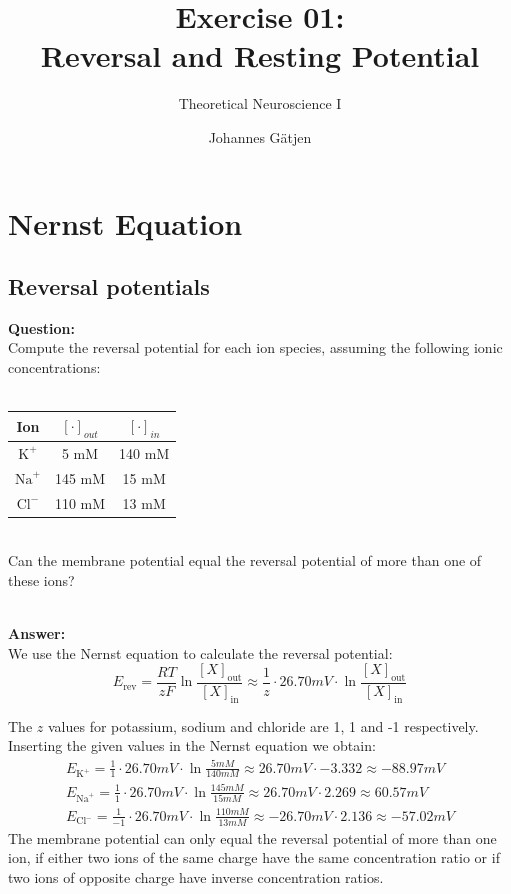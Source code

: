 \documentclass{scrartcl}
\title{Exercise 01:\\Reversal and Resting Potential}
\subtitle{Theoretical Neuroscience I}
\author{Johannes G\"atjen}
\newcommand\Answer{%
  \textbf{\\Answer:}%
}
\newcommand\Question{%
  \textbf{Question:}%
}
\begin{document}
\maketitle

\section{Nernst Equation}
\subsection{Reversal potentials}

\Question\\
Compute the reversal potential for each ion species, assuming the following ionic concentrations:\\
\\
\begin{tabular}{c | c c}
Ion & $[\cdot]_{out}$ & $[\cdot]_{in}$ \\ \hline
$\text{K}^+$ & 5 mM & 140 mM \\
$\text{Na}^+$ & 145 mM & 15 mM \\
$\text{Cl}^-$ & 110 mM & 13 mM
\end{tabular}\\
Can the membrane potential equal the reversal potential of more than one of these ions?

\Answer\\
We use the Nernst equation to calculate the reversal potential:
\begin{equation*}
E_{\text{rev}}=\frac{RT}{zF}\ln \frac{[X]_{\text{out}}}{[X]_{\text{in}}} \approx \frac{1}{z} \cdot 26.70 \si{mV} \cdot \ln \frac{[X]_{\text{out}}}{[X]_{\text{in}}}
\end{equation*}

The $z$ values for potassium, sodium and chloride are 1, 1 and -1 respectively. Inserting the given values in the Nernst equation we obtain:
\begin{equation*}
\begin{split}
E_{\text{K}^+}=\frac{1}{1} \cdot 26.70 \si{mV} \cdot \ln \frac{5 \si{mM}}{140 \si{mM}} \approx 26.70 \si{mV} \cdot -3.332 \approx -88.97 \si{mV}\\
E_{\text{Na}^+}=\frac{1}{1} \cdot 26.70 \si{mV} \cdot \ln \frac{145 \si{mM}}{15 \si{mM}} \approx 26.70 \si{mV} \cdot 2.269 \approx 60.57 \si{mV}\\
E_{\text{Cl}^-}=\frac{1}{-1} \cdot 26.70 \si{mV} \cdot \ln \frac{110 \si{mM}}{13 \si{mM}} \approx {-26.70} \si{mV} \cdot 2.136 \approx -57.02 \si{mV}
\end{split}
\end{equation*}
The membrane potential can only equal the reversal potential of more than one ion, if either two ions of the same charge have the same concentration ratio or if two ions of opposite charge have inverse concentration ratios.
\pagebreak
\end{document}
